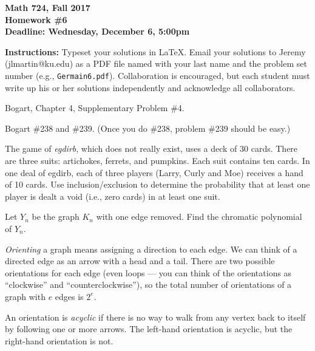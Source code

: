 

\thispagestyle{empty}

\textbf{Math 724, Fall 2017\\
Homework \#6\\
Deadline: Wednesday, December 6, 5:00pm}

\textbf{Instructions:} Typeset your solutions in LaTeX.  Email your solutions to Jeremy (jlmartin@ku.edu) as a PDF file named with your last name and the problem set number (e.g., {\tt Germain6.pdf}).  Collaboration is encouraged, but each student must write up his or her solutions independently and acknowledge all collaborators.

\prob Bogart, Chapter 4, Supplementary Problem \#4.

\prob Bogart \#238 and \#239.  (Once you do \#238, problem \#239 should be easy.)

\prob The game of \textit{egdirb}, which does not really exist, uses a deck of 30 cards.  There are three suits: artichokes, ferrets, and pumpkins.  Each suit contains ten cards.  In one deal of egdirb, each of three players (Larry, Curly and Moe) receives a hand of 10 cards.  Use inclusion/exclusion to determine the probability that at least one player is dealt a void (i.e., zero cards) in at least one suit.

\prob Let $Y_n$ be the graph $K_n$ with one edge removed.  Find the chromatic polynomial of $Y_n$.

\prob \emph{Orienting} a graph means assigning a direction to each edge.  We can think of a directed edge as an arrow with a head and a tail.  There are two possible orientations for each edge (even loops --- you can think of the orientations as ``clockwise'' and ``counterclockwise''), so the total number of orientations of a graph with $e$ edges is $2^e$.

An orientation is \emph{acyclic} if there is no way to walk from any vertex back to itself by following one or more arrows.  The left-hand orientation is acyclic, but the right-hand orientation is not.

